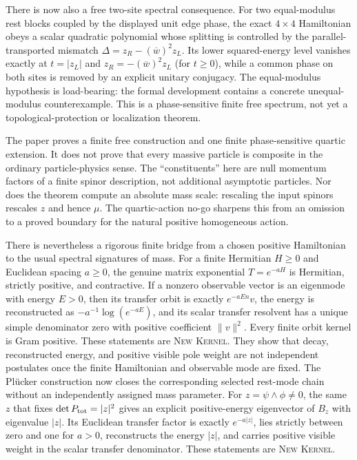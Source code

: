 \documentclass[11pt]{article}
\newcommand{\Kernel}{\textcolor{kernelcolor}{\textsc{Kernel}}}
\newcommand{\NewResult}{\textsc{New}}
\begin{document}
There is now also a free two-site spectral consequence.  For two equal-modulus
rest blocks coupled by the displayed unit edge phase, the exact $4\times4$
Hamiltonian obeys a scalar quadratic polynomial whose splitting is controlled
by the parallel-transported mismatch
$\Delta=z_R-(\overline w)^2z_L$.  Its lower squared-energy level vanishes
exactly at $t=|z_L|$ and
$z_R=-(\overline w)^2z_L$ (for $t\geq0$), while a common phase on both sites
is removed by an explicit unitary conjugacy.  The equal-modulus hypothesis is
load-bearing: the formal development contains a concrete unequal-modulus
counterexample.  This is a phase-sensitive finite free spectrum, not yet a
topological-protection or localization theorem.

The paper proves a finite free construction and one finite phase-sensitive
quartic extension.  It does not prove that every
massive particle is composite in the ordinary particle-physics sense.  The
``constituents'' here are null momentum factors of a finite spinor description,
not additional asymptotic particles.  Nor does the theorem compute an absolute
mass scale: rescaling the input spinors rescales $z$ and hence $\mu$.  The
quartic-action no-go sharpens this from an omission to a proved boundary for
the natural positive homogeneous action.

There is nevertheless a rigorous finite bridge from a chosen positive
Hamiltonian to the usual spectral signatures of mass.  For a finite Hermitian
$H\geq0$ and Euclidean spacing $a\geq0$, the genuine matrix exponential
$T=e^{-aH}$ is Hermitian, strictly positive, and contractive.  If a nonzero
observable vector is an eigenmode with energy $E>0$, then its transfer orbit is
exactly $e^{-aEn}v$, the energy is reconstructed as
$-a^{-1}\log(e^{-aE})$, and its scalar transfer resolvent has a unique simple
denominator zero with positive coefficient $\lVert v\rVert^2$.  Every finite
orbit kernel is Gram positive.  These statements are \NewResult{} \Kernel{}.
They show that decay, reconstructed energy, and positive visible pole weight
are not independent postulates once the finite Hamiltonian and observable mode
are fixed.  The Pl\"ucker construction now closes the corresponding selected
rest-mode chain without an independently assigned mass parameter.  For
$z=\psi\wedge\phi\neq0$, the same $z$ that fixes
$\det P_{\rm tot}=|z|^2$ gives an explicit positive-energy eigenvector of
$B_z$ with eigenvalue $|z|$.  Its Euclidean transfer factor is exactly
$e^{-a|z|}$, lies strictly between zero and one for $a>0$, reconstructs the
energy $|z|$, and carries positive visible weight in the scalar transfer
denominator.  These statements are \NewResult{} \Kernel{}.
\end{document}
